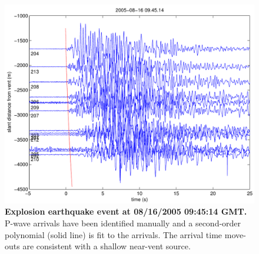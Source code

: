 
%

\begin{figure}[t]
\label{evaluation-fig-jjExplosion}
\begin{center}
\includegraphics[width=\hsize]{./5-evaluation/figs/fidelity/seismicArrival/johnson/2005-08-16_09-45-14.pdf}
\end{center}
\caption{\textbf{Explosion earthquake event at 08/16/2005 09:45:14 GMT.}
P-wave arrivals have been identified manually and a second-order polynomial
(solid line) is fit to the arrivals. The arrival time move-outs are
consistent with a shallow near-vent source.}
\end{figure}

